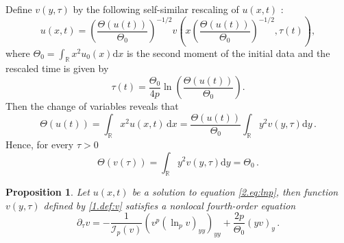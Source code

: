 \documentclass[12pt]{amsart}
\let\pa\partial
\newcommand{\R}{{\mathbb R}}
\newcommand{\dd}{{\mathrm{d}}}
\newcommand{\M}{\Theta}
\newcommand{\I}{\mathcal{I}}
\theoremstyle{plain}
\newtheorem{proposition}[theorem]{Proposition}
\theoremstyle{definition}
\theoremstyle{remark}
\begin{document}
Define $v(y,\tau)$ by the following self-similar rescaling of $u(x,t)$ \cite{CaTo14}:
\begin{equation}\label{1.def:v}
    u(x,t) = \left(\frac{\M(u(t))}{\M_0}\right)^{-1/2} v \left(x\left(\frac{\M(u(t))}{\M_0}\right)^{-1/2}, \tau(t)\right),
\end{equation}
where $\M_0 = \int_\R x^2 u_0(x)\dd x$ is the second moment of the initial data and the rescaled time is given by
\begin{equation}\label{1.def:tau}
    \tau(t) = \frac{\M_0}{4p}\ln\left(\frac{\M(u(t))}{\M_0}\right).
\end{equation}
Then the change of variables reveals that
\begin{equation*}
    \M(u(t)) = \int_\R x^2u(x,t)\, \dd x = \frac{\M(u(t))}{\M_0} \int_\R y^2 v(y,\tau)\dd y\,.
\end{equation*}
Hence, for every $\tau > 0$
\begin{equation*}
   \M(v(\tau)) = \int_\R y^2 v(y,\tau)\dd y = \M_0\,.
\end{equation*}
\begin{proposition}
    Let $u(x,t)$ be a solution to equation \eqref{2.eq:lnp}, then function $v(y,\tau)$ defined by \eqref{1.def:v} satisfies a nonlocal fourth-order equation
    \begin{equation}\label{2.eq:v_p}
        \pa_\tau v = -\frac{1}{\I_p(v)}\left(v^p\left(\ln_{p}v\right)_{yy}\right)_{yy} + \frac{2p}{\M_0}(y v)_y\,.
    \end{equation}
\end{proposition}
\end{document}
